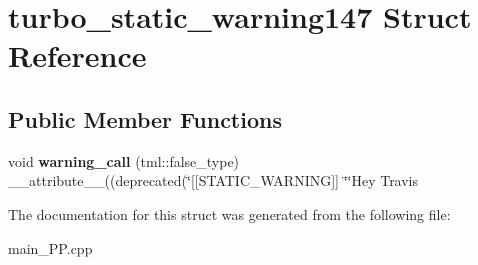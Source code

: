 \hypertarget{structturbo__static__warning147}{\section{turbo\+\_\+static\+\_\+warning147 Struct Reference}
\label{structturbo__static__warning147}
}
\subsection*{Public Member Functions}
\begin{DoxyCompactItemize}
\item 
\hypertarget{structturbo__static__warning147_a300a23a5e3ec12982254d06d53c468df}{void {\bfseries warning\+\_\+call} (tml\+::false\+\_\+type) \+\_\+\+\_\+attribute\+\_\+\+\_\+((deprecated(\char`\"{}\mbox{[}\mbox{[}S\+T\+A\+T\+I\+C\+\_\+\+W\+A\+R\+N\+I\+N\+G\mbox{]}\mbox{]} \char`\"{}\char`\"{}Hey Travis}\label{structturbo__static__warning147_a300a23a5e3ec12982254d06d53c468df}

\end{DoxyCompactItemize}


The documentation for this struct was generated from the following file\+:\begin{DoxyCompactItemize}
\item 
main\+\_\+\+P\+P.\+cpp\end{DoxyCompactItemize}
